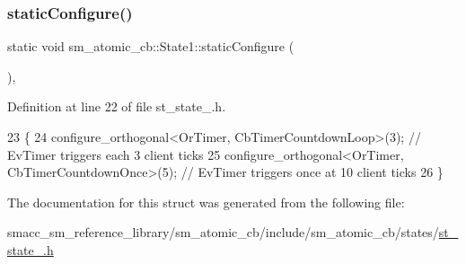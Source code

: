 \subsubsection{\texorpdfstring{static\+Configure()}{staticConfigure()}}
{\footnotesize\ttfamily static void sm\+\_\+atomic\+\_\+cb\+::\+State1\+::static\+Configure (\begin{DoxyParamCaption}{ }\end{DoxyParamCaption})\hspace{0.3cm}{\ttfamily [inline]}, {\ttfamily [static]}}



Definition at line 22 of file st\+\_\+state\+\_.\+h.


\begin{DoxyCode}
23     \{
24         configure\_orthogonal<OrTimer, CbTimerCountdownLoop>(3);  \textcolor{comment}{// EvTimer triggers each 3 client ticks}
25         configure\_orthogonal<OrTimer, CbTimerCountdownOnce>(5); \textcolor{comment}{// EvTimer triggers once at 10 client ticks}
26     \}
\end{DoxyCode}


The documentation for this struct was generated from the following file\+:\begin{DoxyCompactItemize}
\item 
smacc\+\_\+sm\+\_\+reference\+\_\+library/sm\+\_\+atomic\+\_\+cb/include/sm\+\_\+atomic\+\_\+cb/states/\hyperlink{sm__atomic__cb_2include_2sm__atomic__cb_2states_2st__state__1_8h}{st\+\_\+state\+\_.\+h}\end{DoxyCompactItemize}
